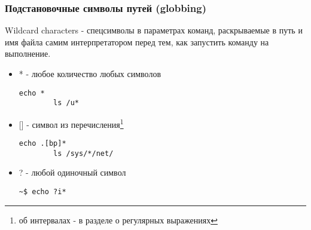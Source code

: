 \begin{frame}[fragile]
  \frametitle{Подстановочные символы путей (globbing)}

  \alert{Wildcard characters} - спецсимволы в параметрах команд, раскрываемые в путь и имя файла самим интерпретатором перед тем, как запустить команду на выполнение. \pause


  \begin{itemize}
    \item \alert{*} - любое количество любых символов
\begin{lstlisting}[basicstyle=\normalsize]
        echo *
        ls /u*
\end{lstlisting} \pause
    \item \alert{[]} - символ из перечисления\footnote{об интервалах - в разделе о регулярных выражениях}
\begin{lstlisting}[basicstyle=\normalsize]
        echo .[bp]*
        ls /sys/*/net/
\end{lstlisting} \pause
    \item \alert{?} - любой одиночный символ
\begin{lstlisting}[basicstyle=\normalsize]
        ~$ echo ?i*
\end{lstlisting} 
  \end{itemize}

\end{frame}

